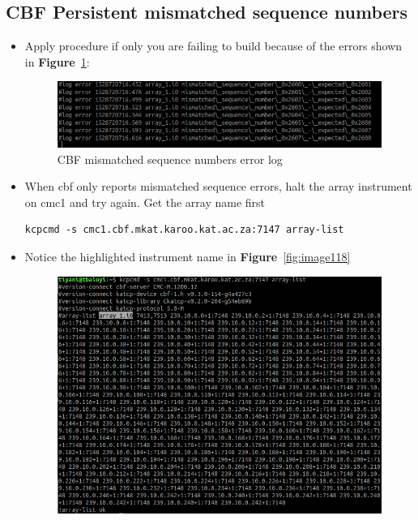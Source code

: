 













\subsection{CBF Persistent mismatched sequence numbers}
\begin{itemize}

\item{} Apply procedure if only you are failing to build because of the errors shown in  \textbf{Figure}~\ref{fig:image95}:
\begin{figure}[!thb]
	\centering
	\includegraphics[scale=0.6]{Chapters/images/image95.png}
	
	\caption{CBF mismatched sequence numbers error log}
	\label{fig:image95}
\end{figure}

\item{} When cbf only reports mismatched sequence errors, halt the array instrument on cmc1 and try again.  Get the array name first
\begin{lstlisting}[style=DOS]
kcpcmd -s cmc1.cbf.mkat.karoo.kat.ac.za:7147 array-list
\end{lstlisting}


\item{} Notice the highlighted instrument name in \textbf{Figure}~\ref{fig:image118} 


\begin{figure}[!thb]
	\centering
	\includegraphics[scale=0.6]{Chapters/images/image118.png}
	

\end{figure}
\end{itemize}
